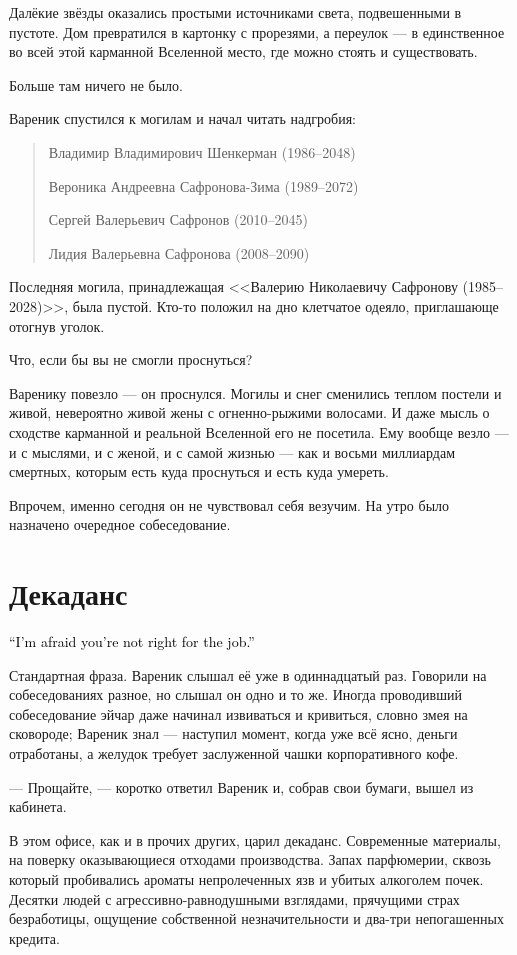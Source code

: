 \documentclass[a4paper,10pt,fleqn]{book}\usepackage{polyglossia}\setdefaultlanguage{english}\setotherlanguage{russian}\defaultfontfeatures{Ligatures=TeX,Mapping=tex-text} \usepackage{xcolor}\definecolor{lightgray}{HTML}{bbbbbb}\color{lightgray}\newcommand{\ml}[3]{\textcolor{black}{#3}}
\begin{document}
Далёкие звёзды оказались простыми источниками света, подвешенными в пустоте.
Дом превратился в картонку с прорезями, а переулок --- в единственное во всей этой карманной Вселенной место, где можно стоять и существовать.

Больше там ничего не было.

Вареник спустился к могилам и начал читать надгробия:

\begin{quote}
Владимир Владимирович Шенкерман (1986--2048)

Вероника Андреевна Сафронова-Зима (1989--2072)

Сергей Валерьевич Сафронов (2010--2045)

Лидия Валерьевна Сафронова (2008--2090)
\end{quote}

Последняя могила, принадлежащая <<Валерию Николаевичу Сафронову (1985--2028)>>, была пустой.
Кто-то положил на дно клетчатое одеяло, приглашающе отогнув уголок.

Что, если бы вы не смогли проснуться?

Варенику повезло --- он проснулся.
Могилы и снег сменились теплом постели и живой, невероятно живой жены с огненно-рыжими волосами.
И даже мысль о сходстве карманной и реальной Вселенной его не посетила.
Ему вообще везло --- и с мыслями, и с женой, и с самой жизнью --- как и восьми миллиардам смертных, которым есть куда проснуться и есть куда умереть.

Впрочем, именно сегодня он не чувствовал себя везучим.
На утро было назначено очередное собеседование.

\section{Декаданс}

\ml{$0$}
{--- Извините, вы нам не подходите.}
{``I'm afraid you're not right for the job.''}

Стандартная фраза.
Вареник слышал её уже в одиннадцатый раз.
Говорили на собеседованиях разное, но слышал он одно и то же.
Иногда проводивший собеседование эйчар даже начинал извиваться и кривиться, словно змея на сковороде;
Вареник знал --- наступил момент, когда уже всё ясно, деньги отработаны, а желудок требует заслуженной чашки корпоративного кофе.

--- Прощайте, --- коротко ответил Вареник и, собрав свои бумаги, вышел из кабинета.

В этом офисе, как и в прочих других, царил декаданс.
Современные материалы, на поверку оказывающиеся отходами производства.
Запах парфюмерии, сквозь который пробивались ароматы непролеченных язв и убитых алкоголем почек.
Десятки людей с агрессивно-равнодушными взглядами, прячущими страх безработицы, ощущение собственной незначительности и два-три непогашенных кредита.
\end{document}
